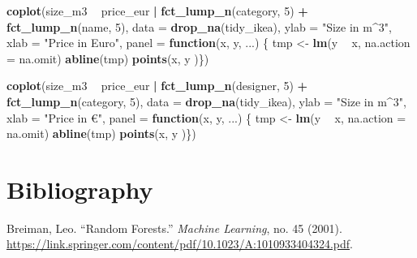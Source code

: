 \documentclass[a4paper, nobind]{templates/ociamthesis}
\newenvironment{Shaded}{\begin{snugshade}}{\end{snugshade}}
\newcommand{\ControlFlowTok}[1]{\textcolor[rgb]{0.13,0.29,0.53}{\textbf{#1}}}
\newcommand{\DataTypeTok}[1]{\textcolor[rgb]{0.13,0.29,0.53}{#1}}
\newcommand{\DecValTok}[1]{\textcolor[rgb]{0.00,0.00,0.81}{#1}}
\newcommand{\KeywordTok}[1]{\textcolor[rgb]{0.13,0.29,0.53}{\textbf{#1}}}
\newcommand{\NormalTok}[1]{#1}
\newcommand{\OperatorTok}[1]{\textcolor[rgb]{0.81,0.36,0.00}{\textbf{#1}}}
\newcommand{\StringTok}[1]{\textcolor[rgb]{0.31,0.60,0.02}{#1}}
\renewenvironment{Shaded}
{
  \vspace{4pt}%
  \begin{snugshade}%
}{%
  \end{snugshade}%
  \vspace{4pt}%
}
\begin{document}
\begin{Shaded}
\begin{Highlighting}[]
\KeywordTok{coplot}\NormalTok{(size_m3 }\OperatorTok{~}\StringTok{ }\NormalTok{price_eur }\OperatorTok{|}\StringTok{ }\KeywordTok{fct_lump_n}\NormalTok{(category, }\DecValTok{5}\NormalTok{) }\OperatorTok{+}\StringTok{ }
\StringTok{         }\KeywordTok{fct_lump_n}\NormalTok{(name, }\DecValTok{5}\NormalTok{), }\DataTypeTok{data =} \KeywordTok{drop_na}\NormalTok{(tidy_ikea), }\DataTypeTok{ylab =} \StringTok{"Size in m^3"}\NormalTok{,}
       \DataTypeTok{xlab =} \StringTok{"Price in Euro"}\NormalTok{, }\DataTypeTok{panel =} \ControlFlowTok{function}\NormalTok{(x, y, ...) \{}
\NormalTok{         tmp <-}\StringTok{ }\KeywordTok{lm}\NormalTok{(y }\OperatorTok{~}\StringTok{ }\NormalTok{x, }\DataTypeTok{na.action =}\NormalTok{ na.omit)}
         \KeywordTok{abline}\NormalTok{(tmp)}
         \KeywordTok{points}\NormalTok{(x, y )\})}
\end{Highlighting}
\end{Shaded}

\begin{Shaded}
\begin{Highlighting}[]
\KeywordTok{coplot}\NormalTok{(size_m3 }\OperatorTok{~}\StringTok{ }\NormalTok{price_eur }\OperatorTok{|}\StringTok{ }\KeywordTok{fct_lump_n}\NormalTok{(designer, }\DecValTok{5}\NormalTok{) }\OperatorTok{+}\StringTok{ }
\StringTok{         }\KeywordTok{fct_lump_n}\NormalTok{(category, }\DecValTok{5}\NormalTok{), }\DataTypeTok{data =} \KeywordTok{drop_na}\NormalTok{(tidy_ikea), }
       \DataTypeTok{ylab =} \StringTok{"Size in m^3"}\NormalTok{,}
       \DataTypeTok{xlab =} \StringTok{"Price in €"}\NormalTok{, }\DataTypeTok{panel =} \ControlFlowTok{function}\NormalTok{(x, y, ...) \{}
\NormalTok{         tmp <-}\StringTok{ }\KeywordTok{lm}\NormalTok{(y }\OperatorTok{~}\StringTok{ }\NormalTok{x, }\DataTypeTok{na.action =}\NormalTok{ na.omit)}
         \KeywordTok{abline}\NormalTok{(tmp)}
         \KeywordTok{points}\NormalTok{(x, y )\})}
\end{Highlighting}
\end{Shaded}

\hypertarget{bibliography}{%
\chapter{Bibliography}\label{bibliography}}

\hypertarget{refs}{}
\leavevmode\hypertarget{ref-Breiman2001}{}%
Breiman, Leo. ``Random Forests.'' \emph{Machine Learning}, no. 45 (2001). \url{https://link.springer.com/content/pdf/10.1023/A:1010933404324.pdf}.
\end{document}
